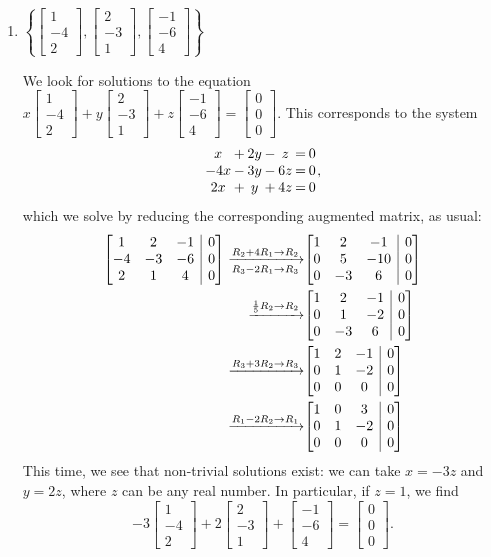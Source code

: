 \documentclass[12pt]{article}
\makeatletter
\newenvironment{amatrix}[1]{%
  \left[\begin{array}{@{}*{#1}{c}|c@{}}
}{%
  \end{array}\right]
}
\newcommand{\bbm}{\begin{bmatrix}}
\newcommand{\ebm}{\end{bmatrix}}
\newcommand{\bam}{\begin{amatrix}}
\newcommand{\eam}{\end{amatrix}}
\makeatother
\begin{document}
\begin{enumerate}
\begin{enumerate}
\item $\left\{\bbm 1\\-4\\2\ebm, \bbm 2\\-3\\1\ebm, \bbm -1\\-6\\4\ebm\right\}$

We look for solutions to the equation $x\bbm 1\\-4\\2\ebm+y \bbm 2\\-3\\1\ebm+z \bbm -1\\-6\\4\ebm = \bbm 0\\0\\0\ebm$. This corresponds to the system
\[\arraycolsep1pt
\begin{array}{ccccccc}
x&+&2y&-&z&=&0\\
-4x&-&3y&-&6z&=&0\\
2x&+&y&+&4z&=&0
\end{array},
\]
which we solve by reducing the corresponding augmented matrix, as usual:
\begin{align*}
\bam{3} 1&2&-1&0\\-4&-3&-6&0\\2&1&4&0\eam \xrightarrow[R_3-2R_1\to R_3]{R_2+4R_1\to R_2} &\bam{3} 1&2&-1&0\\0&5&-10&0\\0&-3&6&0\eam\\
\xrightarrow{\frac15 R_2\to R_2}&\bam{3} 1&2&-1&0\\0&1&-2&0\\0&-3&6&0\eam\\
\xrightarrow{R_3+3R_2\to R_3}&\bam{3} 1&2&-1&0\\0&1&-2&0\\0&0&0&0\eam\\
\xrightarrow{R_1-2R_2\to R_1}&\bam{3} 1&0&3&0\\0&1&-2&0\\0&0&0&0\eam
\end{align*}
This time, we see that non-trivial solutions exist: we can take $x=-3z$ and $y=2z$, where $z$ can be any real number. In particular, if $z=1$, we find
\[
-3\bbm 1\\-4\\2\ebm+2 \bbm 2\\-3\\1\ebm+ \bbm -1\\-6\\4\ebm = \bbm 0\\0\\0\ebm.
\]


\end{enumerate}
\end{enumerate}
\end{document}
